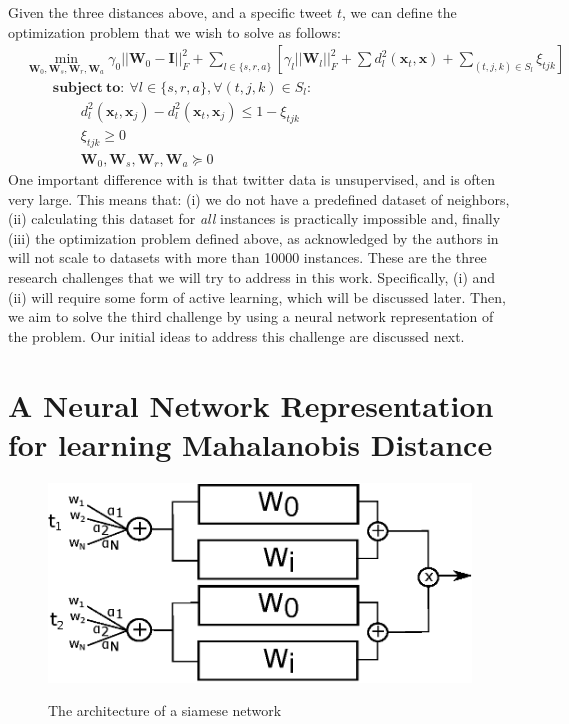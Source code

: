 \documentclass[letterpaper]{article}
\begin{document}
Given the three distances above, and a specific tweet $t$, we can define the optimization problem that we wish to solve as follows: 
{\footnotesize
\begin{align}
&\min_{\mathbf{W}_0, \mathbf{W}_s, \mathbf{W}_r, \mathbf{W}_a} \gamma_0 || \mathbf{W}_0 - \mathbf{I}||^2_F + \sum_{l \in \{s, r, a\}} \left[  \gamma_l || \mathbf{W}_l ||^2_F + \sum d_{l}^2 ( \mathbf{x}_t, \mathbf{x} ) + \sum_{(t,j,k) \in S_l} \xi_{tjk} \right]\\
&\quad \quad \mathbf{subject\ to:}\ \forall l \in \{ s, r, a\}, \forall (t, j, k) \in S_l: \\
& \quad \quad \quad \quad d^2_l ( \mathbf{x}_t,  \mathbf{x}_j) - d^2_l ( \mathbf{x}_t,  \mathbf{x}_j) \leq 1 - \xi_{tjk}\\ 
& \quad \quad \quad \quad \xi_{tjk} \geq 0\\
& \quad \quad \quad \quad \mathbf{W}_0, \mathbf{W}_s, \mathbf{W}_r, \mathbf{W}_a \succeq	0
\end{align}
}
One important difference with \cite{Parameswaran2010a} is that twitter data is unsupervised, and is often very large. This means that: (i) we do not have a predefined dataset of neighbors, (ii) calculating this dataset for \emph{all} instances is practically impossible and, finally (iii) the optimization problem defined above, as acknowledged by the authors in \cite{Parameswaran2010a} will not scale to datasets with more than 10000 instances.  These are the three research challenges that we will try to address in this work. Specifically, (i) and (ii) will require some form of active learning, which will be discussed later. Then, we aim to solve the third challenge by using a neural network representation of the problem. Our initial ideas to address this challenge are discussed next.

\section{A Neural Network Representation for learning Mahalanobis Distance}

\begin{figure}
\centering
\includegraphics[width=0.7\linewidth]{figures/siamese_1}
\label{fig:siamese_1}
\caption{The architecture of a siamese network}
\end{figure}
\end{document}
